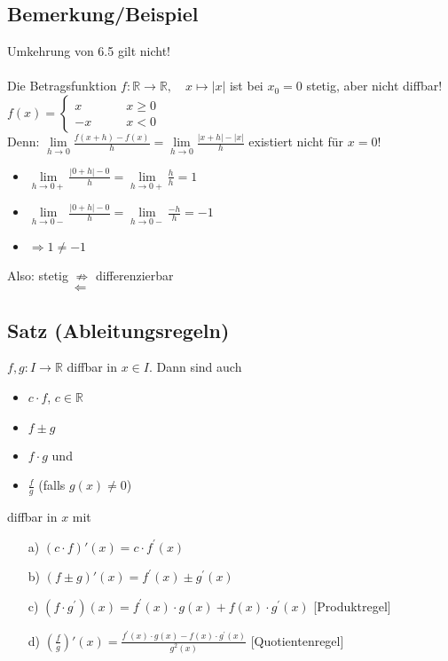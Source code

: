 \documentclass[12pt, titlepage]{article}
\newcommand{\R}{\mathds{R}}
\renewcommand{\>}{\rightarrow}
\renewcommand{\*}{\cdot}
\begin{document}
	\subsection{Bemerkung/Beispiel}
	Umkehrung von 6.5 gilt nicht!\\
	\\
	Die Betragsfunktion $f\colon \R\>\R,\quad x\mapsto |x|$ ist bei $x_0=0$ stetig, aber nicht diffbar!\\
	$f(x)=\begin{cases}x&\qquad x\geq0\\
	-x&\qquad x<0
	\end{cases}$\\
	Denn: $\lim\limits_{h\>0}\frac{f(x+h)-f(x)}{h}=\lim\limits_{h\>0}\frac{|x+h|-|x|}{h}$ existiert nicht für $x=0$!
	\begin{itemize}
		\item $\lim\limits_{h\>0+}\frac{|0+h|-0}{h}=\lim\limits_{h\>0+}\frac{h}{h}=1$
		\item $\lim\limits_{h\>0-}\frac{|0+h|-0}{h}=\lim\limits_{h\>0-}\frac{-h}{h}=-1$
		\item $\Rightarrow 1\neq-1$
	\end{itemize}
	Also: stetig $\nRightarrow$ differenzierbar\\
	${}^{}\qquad\qquad{}^{}\quad\Leftarrow$
	\subsection{Satz (Ableitungsregeln)}
	$f,g\colon I\>\R$ diffbar in $x\in I$. Dann sind auch
	\begin{itemize}
		\item $c\*f$, $c\in\R$
		\item $f\pm g$
		\item $f\*g$ und
		\item $\frac{f}{g}$ (falls $g(x)\neq0$)
	\end{itemize}
	diffbar in $x$ mit
	\begin{itemize}
		\item[a)] $(c\*f)'(x)=c\*f^\prime(x)$
		\item[b)] $(f\pm g)'(x)=f^\prime(x)\pm g^\prime(x)$
		\item[c)] $(f\*g^\prime)(x)=f^\prime(x)\*g(x)+f(x)\*g^\prime(x)$ [Produktregel]
		\item[d)] $(\frac{f}{g})'(x)=\frac{f^\prime(x)\*g(x)-f(x)\*g^\prime(x)}{g^2(x)}$ [Quotientenregel]
	\end{itemize}
\end{document}
